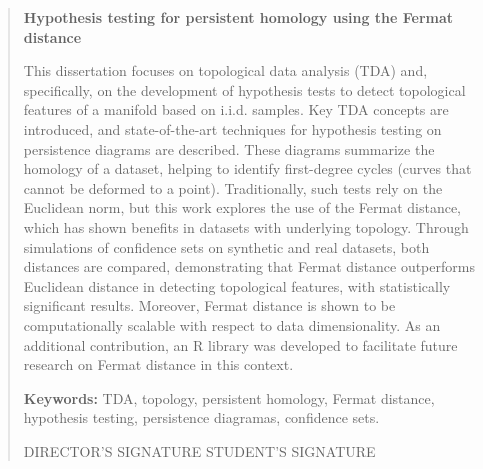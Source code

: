 \renewcommand{\abstractname}{Abstract}
\begin{abstract}
    \textbf{Hypothesis testing for persistent homology using the Fermat distance}

    This dissertation focuses on topological data analysis (TDA) and, specifically, on the development of hypothesis tests to detect topological features of a manifold based on i.i.d. samples. Key TDA concepts are introduced, and state-of-the-art techniques for hypothesis testing on persistence diagrams are described. These diagrams summarize the homology of a dataset, helping to identify first-degree cycles (curves that cannot be deformed to a point). Traditionally, such tests rely on the Euclidean norm, but this work explores the use of the Fermat distance, which has shown benefits in datasets with underlying topology. Through simulations of confidence sets on synthetic and real datasets, both distances are compared, demonstrating that Fermat distance outperforms Euclidean distance in detecting topological features, with statistically significant results. Moreover, Fermat distance is shown to be computationally scalable with respect to data dimensionality. As an additional contribution, an R library was developed to facilitate future research on Fermat distance in this context.


    \textbf{Keywords:} TDA, topology, persistent homology, Fermat distance, hypothesis testing, persistence diagramas, confidence sets.

    \begin{flushleft}
    \vfill

    DIRECTOR'S SIGNATURE \hfill STUDENT'S SIGNATURE
    \end{flushleft}

\end{abstract}
